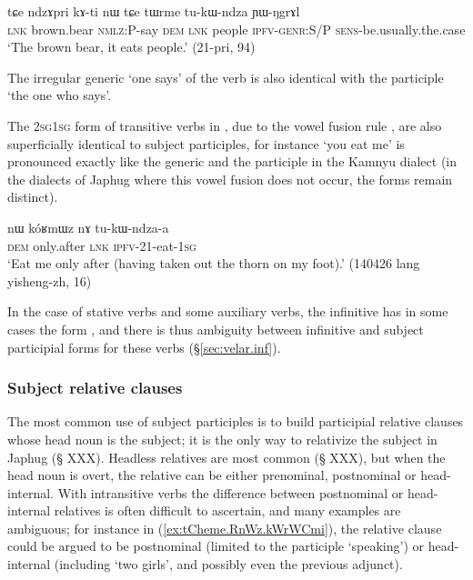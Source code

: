 \begin{exe}
\ex \label{ex:tukWndza.genr}
 \gll tɕe ndzɤpri kɤ-ti nɯ tɕe tɯrme tu-kɯ-ndza ɲɯ-ŋgrɤl  \\
 \textsc{lnk} brown.bear \textsc{nmlz}:P-say \textsc{dem} \textsc{lnk} people \textsc{ipfv}-\textsc{genr}:S/P \textsc{sens}-be.usually.the.case \\
\glt `The brown bear, it eats people.' (21-pri, 94)
\end{exe}
 
The irregular generic  `one says' of the verb  is also identical with the participle `the one who says'.

The \textsc{2sg}\fl{}\textsc{1sg} form of transitive verbs in , due to the vowel fusion rule  \fl{} , are also superficially identical to subject participles, for instance  `you eat me' is pronounced  exactly like the generic and the participle  in the Kamnyu dialect (in the dialects of Japhug where this vowel fusion does not occur, the forms remain distinct).

\begin{exe}
\ex \label{ex:tukWndzaa}
 \gll nɯ kóʁmɯz nɤ tu-kɯ-ndza-a \\
 \textsc{dem} only.after \textsc{lnk} \textsc{ipfv}-2\fl{}1-eat-\textsc{1sg} \\
 \glt `Eat me only after (having taken out the thorn on my foot).' (140426 lang yisheng-zh, 16)
\end{exe} 

In the case of stative verbs and some auxiliary verbs, the infinitive has in some cases the form , and there is thus ambiguity between infinitive and subject participial forms for these verbs (§\ref{sec:velar.inf}).

\subsubsection{Subject relative clauses}  \label{sec:subject.participle.subject.relative}
The most common use of subject participles is to build participial relative clauses whose head noun is the subject; it is the only way to relativize the subject in Japhug (§ XXX). Headless relatives are most common (§ XXX), but when the head noun is overt, the relative can be either prenominal, postnominal or head-internal. With intransitive verbs the difference between postnominal or head-internal relatives is often difficult to ascertain, and many examples are ambiguous; for instance in (\ref{ex:tCheme.RnWz.kWrWCmi}), the relative clause could be argued to be postnominal (limited to the participle  `speaking') or head-internal (including  `two girls', and possibly even the previous adjunct).

